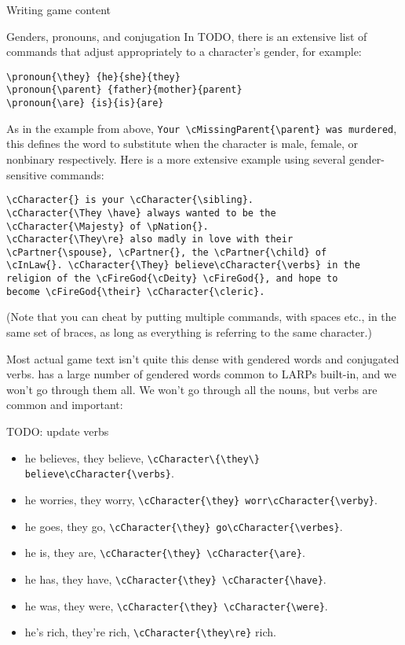 \documentclass{article}
\begin{document}
\begin{section}{Writing game content}
\begin{subsection}{Genders, pronouns, and conjugation}
In TODO, there is an extensive list of commands that adjust appropriately to a character's gender, for example:
\begin{verbatim}
\pronoun{\they} {he}{she}{they}
\pronoun{\parent} {father}{mother}{parent}
\pronoun{\are} {is}{is}{are}
\end{verbatim}

As in the example from above, \lstinline|Your \cMissingParent{\parent} was murdered|, this defines the word to substitute when the character is male, female, or nonbinary respectively.  Here is a more extensive example using several gender-sensitive commands:

\begin{verbatim}
\cCharacter{} is your \cCharacter{\sibling}.
\cCharacter{\They \have} always wanted to be the
\cCharacter{\Majesty} of \pNation{}.  
\cCharacter{\They\re} also madly in love with their 
\cPartner{\spouse}, \cPartner{}, the \cPartner{\child} of 
\cInLaw{}. \cCharacter{\They} believe\cCharacter{\verbs} in the 
religion of the \cFireGod{\cDeity} \cFireGod{}, and hope to 
become \cFireGod{\their} \cCharacter{\cleric}.
\end{verbatim}

(Note that you can cheat by putting multiple commands, with spaces etc., in the same set of braces, as long as everything is referring to the same character.)

Most actual game text isn't quite this dense with gendered words and conjugated verbs.  \gametex{} has a large number of gendered words common to LARPs built-in, and we won't go through them all.  We won't go through all the nouns, but verbs are common and important:


TODO: update verbs
\begin{itemize}
\item he believes, they believe, \lstinline|\cCharacter\{\they\} believe\cCharacter{\verbs}|.
\item he worries, they worry, \lstinline|\cCharacter{\they} worr\cCharacter{\verby}|.
\item he goes, they go, \lstinline|\cCharacter{\they} go\cCharacter{\verbes}|.
\item he is, they are, \lstinline|\cCharacter{\they} \cCharacter{\are}|.
\item he has, they have, \lstinline|\cCharacter{\they} \cCharacter{\have}|.
\item he was, they were, \lstinline|\cCharacter{\they} \cCharacter{\were}|.
\item he's rich, they're rich, \lstinline|\cCharacter{\they\re}| rich.
\end{itemize}


\end{subsection}
\end{section}
\end{document}
